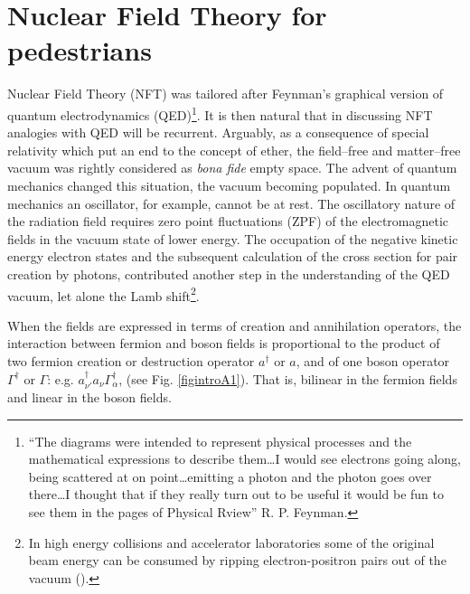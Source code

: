 \section{Nuclear Field Theory for pedestrians}\label{appintroA}

Nuclear Field Theory (NFT) was tailored after Feynman's graphical version of quantum electrodynamics (QED)\footnote{``The diagrams were intended to represent physical processes and the mathematical expressions to describe them\dots I would see electrons going along, being scattered at on point\dots emitting a photon and the photon goes over there\dots I thought that if they really turn out to be useful it would be fun to see them in the pages of Physical Rview'' R. P. Feynman.}. It is then natural that in discussing NFT analogies with QED will be recurrent.   Arguably, as a consequence of special relativity which put an end to the concept of ether, the field--free and matter--free vacuum was rightly considered as \textit{bona fide} empty space. The advent of quantum mechanics changed this situation, the vacuum becoming populated. In quantum mechanics an oscillator, for example, cannot be at rest. The oscillatory nature of the radiation field requires zero point fluctuations (ZPF) of the electromagnetic fields in the vacuum state of lower energy. The occupation of the negative kinetic energy electron states and the subsequent calculation of the cross section for pair creation by photons, contributed another step in the understanding of the QED vacuum, let alone the Lamb shift\footnote{In high energy collisions and accelerator laboratories some of the original beam energy can be consumed by ripping electron-positron pairs out of the vacuum (\cite{Bruce:07}).}.


When the fields are expressed in terms of creation and annihilation operators, the interaction between  fermion and boson fields is proportional to the product of two fermion creation or destruction operator $a^\dagger$ or $a$, and of one boson operator $\Gamma^\dagger$ or $\Gamma$: e.g. $a^\dagger_{\nu'}a_\nu\Gamma_\alpha^\dagger$, (see Fig. \ref{figintroA1}). That is,  bilinear in the fermion fields and linear in the boson fields.

